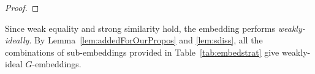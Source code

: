 \begin{proof}
	
\end{proof}


Since weak equality and strong similarity hold, the embedding performs \textit{weakly-ideally}. {By Lemma~\ref{lem:addedForOurPropos} and \ref{lem:sdiss}, all the combinations of sub-embeddings provided in Table~\ref{tab:embedstrat} give weakly-ideal $G$-embeddings.} 

%

